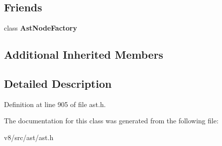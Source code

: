 \subsection*{Friends}
\begin{DoxyCompactItemize}
\item 
\mbox{\label{classv8_1_1internal_1_1IfStatement_a8d587c8ad3515ff6433eb83c578e795f}} 
class {\bfseries Ast\+Node\+Factory}
\end{DoxyCompactItemize}
\subsection*{Additional Inherited Members}


\subsection{Detailed Description}


Definition at line 905 of file ast.\+h.



The documentation for this class was generated from the following file\+:\begin{DoxyCompactItemize}
\item 
v8/src/ast/ast.\+h\end{DoxyCompactItemize}
